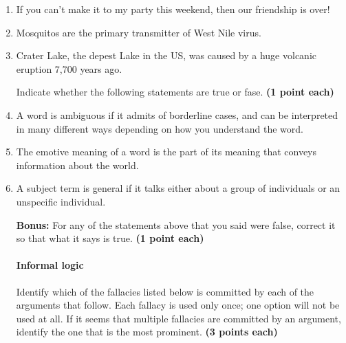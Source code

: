 \documentclass[10pt]{article}
\begin{document}
\begin{enumerate}
  \item If you can't make it to my party this weekend, then our friendship is over! \underline{\hspace{2in}}
  
  \item Mosquitos are the primary transmitter of West Nile virus. \underline{\hspace{2in}}
  
  \item Crater Lake, the depest Lake in the US, was caused by a huge volcanic eruption 7,700 years ago. \underline{\hspace{2in}}
  

\vspace{0.5cm}

Indicate whether the following statements are true or fase. \textbf{(1 point each)}


\item A word is ambiguous if it admits of borderline cases, and can be interpreted in many different ways depending on how you understand the word. \underline{\hspace{1.5in}}

\item The emotive meaning of a word is the part of its meaning that conveys information about the world. \underline{\hspace{1.5in}}

\item A subject term is general if it talks either about a group of individuals or an unspecific individual. \underline{\hspace{1.5in}}


\textbf{Bonus:} For any of the statements above that you said were false, correct it so that what it says is true. \textbf{(1 point each)}

\vspace{1.5cm}

\paragraph{Informal logic}

Identify which of the fallacies listed below is committed by each of the arguments that follow. Each fallacy is used only once; one option will not be used at all. If it seems that multiple fallacies are committed by an argument, identify the one that is the most prominent. \textbf{(3 points each)}


\end{enumerate}
\end{document}
